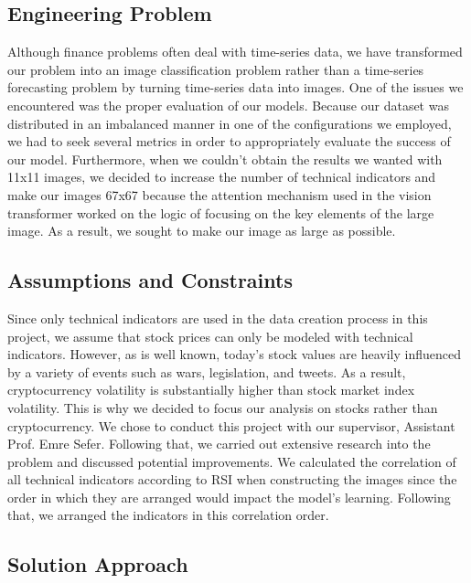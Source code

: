 \documentclass[]{article}
\begin{document}
\subsection{Engineering Problem}
Although finance problems often deal with time-series data, we have transformed our problem into an image classification problem rather than a time-series forecasting problem by turning time-series data into images. One of the issues we encountered was the proper evaluation of our models. Because our dataset was distributed in an imbalanced manner in one of the configurations we employed, we had to seek several metrics in order to appropriately evaluate the success of our model. Furthermore, when we couldn't obtain the results we wanted with 11x11 images, we decided to increase the number of technical indicators and make our images 67x67 because the attention mechanism used in the vision transformer worked on the logic of focusing on the key elements of the large image. As a result, we sought to make our image as large as possible.

\subsection{Assumptions and Constraints}
Since only technical indicators are used in the data creation process in this project, we assume that stock prices can only be modeled with technical indicators. However, as is well known, today's stock values are heavily influenced by a variety of events such as wars, legislation, and tweets. As a result, cryptocurrency volatility is substantially higher than stock market index volatility. This is why we decided to focus our analysis on stocks rather than cryptocurrency. \vspace{0.1cm} \newline
We chose to conduct this project with our supervisor, Assistant Prof. Emre Sefer. Following that, we carried out extensive research into the problem and discussed potential improvements. \vspace{0.1cm} \newline
We calculated the correlation of all technical indicators according to RSI when constructing the images since the order in which they are arranged would impact the model's learning. Following that, we arranged the indicators in this correlation order.
\begin{center}
    \item\section{Solution Approach}
\end{center}
\end{document}

